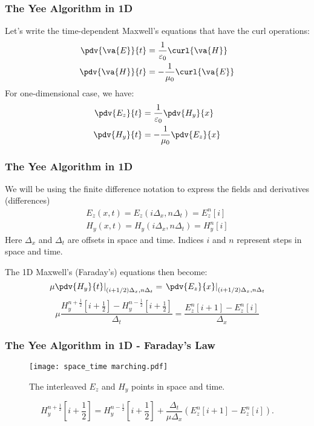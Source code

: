 \documentclass[10pt]{beamer}
\newcommand{\E}{\varepsilon}  %
\renewcommand{\u}{\mu}  %
\begin{document}
\begin{frame}
    \frametitle{The Yee Algorithm in 1D}
    Let's write the time-dependent Maxwell's equations that have the curl operations:
    \begin{align*}
        \pdv{\va{E}}{t} & = \frac{1}{\E_0} \curl{\va{H}}  \\
        \pdv{\va{H}}{t} & = -\frac{1}{\u_0} \curl{\va{E}}
    \end{align*}
    For one-dimensional case, we have:
    \begin{align*}
        \pdv{{E_z}}{t} & = \frac{1}{\E_0} \pdv{H_y}{x}  \\
        \pdv{{H_y}}{t} & = -\frac{1}{\u_0} \pdv{E_z}{x}
    \end{align*}


\end{frame}

\begin{frame}
    \frametitle{The Yee Algorithm in 1D}
    We will be using the finite difference notation to express the fields and derivatives (differences)
    \begin{align*}
        E_{z}(x, t)=E_{z}\left(i \Delta_{x}, n \Delta_{t}\right)=E_{z}^{n}[i] \\
        H_{y}(x, t)=H_{y}\left(i \Delta_{x}, n \Delta_{t}\right)=H_{y}^{n}[i]
    \end{align*}
    Here $\Delta_x$ and $\Delta_t$ are offsets in space and time. Indices $i$ and $n$ represent steps in space and time.

    The 1D Maxwell's (Faraday's) equations then become:
    \begin{equation*}
        \left.\u \pdv{H_y}{t}
        \right|_{(i+1/2)\Delta_x,n\Delta_t}
        =
        \left.\pdv{E_z}{x}\right|_{(i+1/2)\Delta_x,n\Delta_t}
        \label{eq:faradayDiscrete}
    \end{equation*}
    \begin{equation*}
        \u\frac{H_y^{n+\frac{1}{2}}\left[i+\frac{1}{2}\right] -
        H_y^{n-\frac{1}{2}} \left[i+\frac{1}{2}\right]} {\Delta_t} =
        \frac{E_z^{n} \left[i+1\right] - E_z^{n} \left[i\right]}{\Delta_x}
        \label{eq:faradayFdtd1D}
    \end{equation*}
\end{frame}

\begin{frame}[fragile]
    \frametitle{The Yee Algorithm in 1D - Faraday's Law}

    \begin{figure}[h!]
        \centering
        \texttt{[image: space\_time marching.pdf]}
        \caption{The interleaved $E_z$ and $H_y$ points in space and time.}
    \end{figure}

    \begin{equation}
        H_y^{n+\frac{1}{2}}\left[i+\frac{1}{2}\right] = H_y^{n-\frac{1}{2}}\left[i+\frac{1}{2}\right] +
        \frac{\Delta_t}{\mu\Delta_x}
        \left(E_z^{n}\left[i+1\right] - E_z^{n}\left[i\right]\right).
        \label{eq:updateHy}
    \end{equation}

\end{frame}
\end{document}
